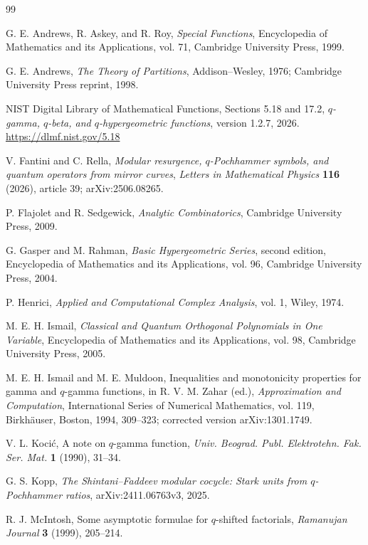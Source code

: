 \documentclass[11pt,a4paper,oneside,openany]{book}
\theoremstyle{definition}
\theoremstyle{remark}
\begin{document}
\begin{thebibliography}{99}

G. E. Andrews, R. Askey, and R. Roy,
\emph{Special Functions}, Encyclopedia of Mathematics and its Applications,
vol. 71, Cambridge University Press, 1999.

G. E. Andrews,
\emph{The Theory of Partitions}, Addison--Wesley, 1976; Cambridge University
Press reprint, 1998.

NIST Digital Library of Mathematical Functions,
Sections 5.18 and 17.2, \emph{\(q\)-gamma, \(q\)-beta, and
\(q\)-hypergeometric functions}, version 1.2.7, 2026.
\url{https://dlmf.nist.gov/5.18}

V. Fantini and C. Rella,
\emph{Modular resurgence, \(q\)-Pochhammer symbols, and quantum operators
from mirror curves}, \emph{Letters in Mathematical Physics} \textbf{116}
(2026), article 39; arXiv:2506.08265.

P. Flajolet and R. Sedgewick,
\emph{Analytic Combinatorics}, Cambridge University Press, 2009.

G. Gasper and M. Rahman,
\emph{Basic Hypergeometric Series}, second edition, Encyclopedia of
Mathematics and its Applications, vol. 96, Cambridge University Press, 2004.

P. Henrici,
\emph{Applied and Computational Complex Analysis}, vol. 1, Wiley, 1974.

M. E. H. Ismail,
\emph{Classical and Quantum Orthogonal Polynomials in One Variable},
Encyclopedia of Mathematics and its Applications, vol. 98, Cambridge
University Press, 2005.

M. E. H. Ismail and M. E. Muldoon,
Inequalities and monotonicity properties for gamma and \(q\)-gamma functions,
in R. V. M. Zahar (ed.), \emph{Approximation and Computation}, International
Series of Numerical Mathematics, vol. 119, Birkh\"auser, Boston, 1994,
309--323; corrected version arXiv:1301.1749.

V. L. Koci\'c,
A note on \(q\)-gamma function,
\emph{Univ. Beograd. Publ. Elektrotehn. Fak. Ser. Mat.} \textbf{1}
(1990), 31--34.

G. S. Kopp,
\emph{The Shintani--Faddeev modular cocycle: Stark units from
\(q\)-Pochhammer ratios}, arXiv:2411.06763v3, 2025.

R. J. McIntosh,
Some asymptotic formulae for \(q\)-shifted factorials,
\emph{Ramanujan Journal} \textbf{3} (1999), 205--214.


\end{thebibliography}
\end{document}
